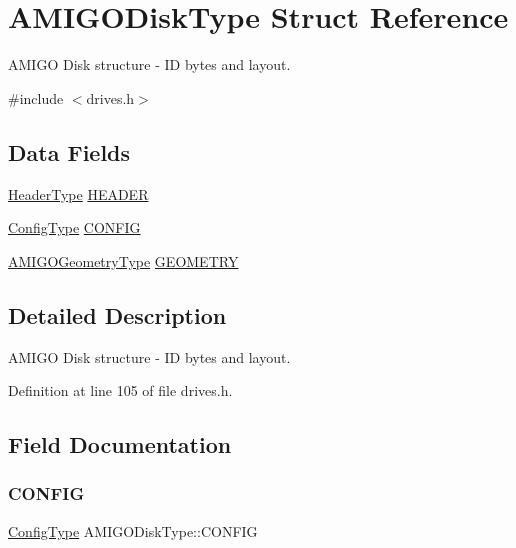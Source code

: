 \hypertarget{structAMIGODiskType}{}\section{A\+M\+I\+G\+O\+Disk\+Type Struct Reference}
\label{structAMIGODiskType}


A\+M\+I\+GO Disk structure -\/ ID bytes and layout.  




{\ttfamily \#include $<$drives.\+h$>$}

\subsection*{Data Fields}
\begin{DoxyCompactItemize}
\item 
\hyperlink{structHeaderType}{Header\+Type} \hyperlink{structAMIGODiskType_a9814efe6f564b104fc7e0100231908a8}{H\+E\+A\+D\+ER}
\item 
\hyperlink{structConfigType}{Config\+Type} \hyperlink{structAMIGODiskType_aae94c3403ceb917006591e7bd4109207}{C\+O\+N\+F\+IG}
\item 
\hyperlink{structAMIGOGeometryType}{A\+M\+I\+G\+O\+Geometry\+Type} \hyperlink{structAMIGODiskType_ade07402a60cc0e5824ca61f6a4ea88d9}{G\+E\+O\+M\+E\+T\+RY}
\end{DoxyCompactItemize}


\subsection{Detailed Description}
A\+M\+I\+GO Disk structure -\/ ID bytes and layout. 

Definition at line 105 of file drives.\+h.



\subsection{Field Documentation}
\mbox{\label{structAMIGODiskType_aae94c3403ceb917006591e7bd4109207}} 
\subsubsection{\texorpdfstring{C\+O\+N\+F\+IG}{CONFIG}}
{\footnotesize\ttfamily \hyperlink{structConfigType}{Config\+Type} A\+M\+I\+G\+O\+Disk\+Type\+::\+C\+O\+N\+F\+IG}



